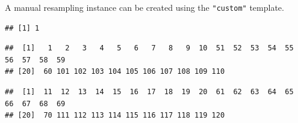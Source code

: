\documentclass[]{scrbook}
\newenvironment{Shaded}{\begin{snugshade}}{\end{snugshade}}
\newcommand{\DataTypeTok}[1]{\textcolor[rgb]{0.13,0.29,0.53}{#1}}
\newcommand{\DecValTok}[1]{\textcolor[rgb]{0.00,0.00,0.81}{#1}}
\newcommand{\KeywordTok}[1]{\textcolor[rgb]{0.13,0.29,0.53}{\textbf{#1}}}
\newcommand{\NormalTok}[1]{#1}
\newcommand{\OperatorTok}[1]{\textcolor[rgb]{0.81,0.36,0.00}{\textbf{#1}}}
\newcommand{\StringTok}[1]{\textcolor[rgb]{0.31,0.60,0.02}{#1}}
\renewenvironment{Shaded} {\begin{snugshade}\small} {\end{snugshade}}
\begin{document}
A manual resampling instance can be created using the \texttt{"custom"} template.

\begin{Shaded}
\end{Shaded}

\begin{verbatim}
## [1] 1
\end{verbatim}

\begin{Shaded}
\end{Shaded}

\begin{verbatim}
##  [1]   1   2   3   4   5   6   7   8   9  10  51  52  53  54  55  56  57  58  59
## [20]  60 101 102 103 104 105 106 107 108 109 110
\end{verbatim}

\begin{Shaded}
\end{Shaded}

\begin{verbatim}
##  [1]  11  12  13  14  15  16  17  18  19  20  61  62  63  64  65  66  67  68  69
## [20]  70 111 112 113 114 115 116 117 118 119 120
\end{verbatim}
\end{document}
